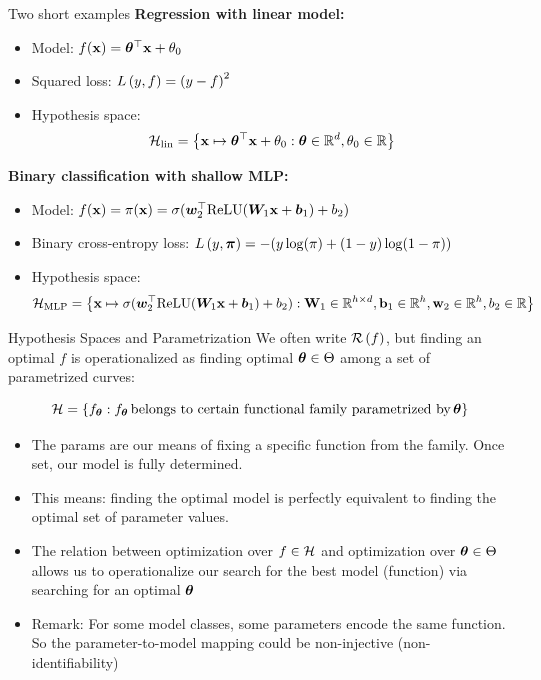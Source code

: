 \documentclass[11pt,compress,t,notes=noshow, xcolor=table]{beamer}
\begin{document}
\begin{vbframe}{Two short examples}
\textbf{Regression with linear model:}\\
\begin{itemize}
    \item Model: $f(\mathbf{x}) = \bm{\theta}^\top \mathbf{x} + \theta_0$
    \item Squared loss:  
    $L\left(y, f\right) = \left(y-f\right)^2$
    \item Hypothesis space: $$\mathcal{H}_{\text{lin}} = \left\{ \mathbf{x} \mapsto \bm{\theta}^\top \mathbf{x} + \theta_0 : \bm{\theta} \in \mathbb{R}^d, \theta_0 \in \mathbb{R} \right\}$$
\end{itemize}

\vspace{0.3cm}

\textbf{Binary classification with shallow MLP:}\\
\begin{itemize}
    \item Model: $f(\mathbf{x}) = \pi(\mathbf{x})= \sigma(\bm{w}_2^{\top} \text{ReLU}(\bm{W}_1 \mathbf{x} + \bm{b}_1) + b_2)$
    \item Binary cross-entropy loss: $L\left(y, \bm{\pi}\right) = -(y\log(\pi)+(1-y)\log(1-\pi))$\\ 
    \item Hypothesis space: {\small $$\mathcal{H}_{\text{MLP}} = \left\{ \mathbf{x} \mapsto \sigma(\bm{w}_2^{\top} \text{ReLU}(\bm{W}_1 \mathbf{x} + \bm{b}_1) + b_2): \mathbf{W}_1 \in \mathbb{R}^{h \times d}, \mathbf{b}_1 \in \mathbb{R}^h, \mathbf{w}_2 \in \mathbb{R}^h, b_2 \in \mathbb{R} \right\}$$}
\end{itemize}
  
\end{vbframe}

\begin{vbframe}{Hypothesis Spaces and Parametrization}
We often write $\mathcal{R} \left(f\right)$, but finding an optimal $f$ is operationalized as finding optimal $\bm{\theta} \in \Theta$ among a set of parametrized curves:

$$\mathcal{H} = \{f_{\bm{\theta}}: f_{\bm{\theta}}\,\text{belongs to certain functional family parametrized by}\,\bm{\theta}\}$$

\begin{itemize}
    \item The params are our means of fixing a specific function from the family. Once set, our model is fully determined.
    \item This means: finding the optimal model is perfectly equivalent to finding the optimal set of parameter values.
    \item The relation between optimization over $f \in \mathcal{H}$ and optimization
over $\bm{\theta} \in \Theta$ allows us to operationalize our search for the best model (function) via searching for an optimal $\bm{\theta}$
\item Remark: For some model classes, some parameters encode the same function. So the
parameter-to-model mapping could be non-injective (non-identifiability)
\end{itemize}

\end{vbframe}
\end{document}
